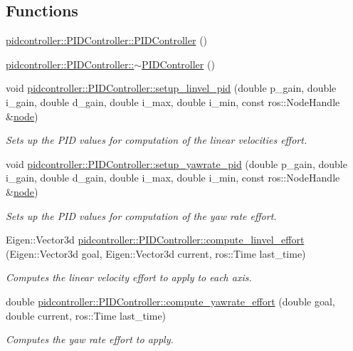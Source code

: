 \subsection*{Functions}
\begin{DoxyCompactItemize}
\item 
\mbox{\hyperlink{group__test__utils_ga67cc314aa5b3b4e9c47ac414b3a4c008}{pidcontroller\+::\+P\+I\+D\+Controller\+::\+P\+I\+D\+Controller}} ()
\item 
\mbox{\hyperlink{group__test__utils_ga4ae30cc03173417fa6edb5c055966a3f}{pidcontroller\+::\+P\+I\+D\+Controller\+::$\sim$\+P\+I\+D\+Controller}} ()
\item 
void \mbox{\hyperlink{group__test__utils_ga845b866b1ae4b73e39e4ca42395750b3}{pidcontroller\+::\+P\+I\+D\+Controller\+::setup\+\_\+linvel\+\_\+pid}} (double p\+\_\+gain, double i\+\_\+gain, double d\+\_\+gain, double i\+\_\+max, double i\+\_\+min, const ros\+::\+Node\+Handle \&\mbox{\hyperlink{structnode}{node}})
\begin{DoxyCompactList}\small\item\em Sets up the P\+ID values for computation of the linear velocities effort. \end{DoxyCompactList}\item 
void \mbox{\hyperlink{group__test__utils_ga5d8a387440921ea68907364c0e1d7b5b}{pidcontroller\+::\+P\+I\+D\+Controller\+::setup\+\_\+yawrate\+\_\+pid}} (double p\+\_\+gain, double i\+\_\+gain, double d\+\_\+gain, double i\+\_\+max, double i\+\_\+min, const ros\+::\+Node\+Handle \&\mbox{\hyperlink{structnode}{node}})
\begin{DoxyCompactList}\small\item\em Sets up the P\+ID values for computation of the yaw rate effort. \end{DoxyCompactList}\item 
Eigen\+::\+Vector3d \mbox{\hyperlink{group__test__utils_gac62955a265057681e6399488ced3471a}{pidcontroller\+::\+P\+I\+D\+Controller\+::compute\+\_\+linvel\+\_\+effort}} (Eigen\+::\+Vector3d goal, Eigen\+::\+Vector3d current, ros\+::\+Time last\+\_\+time)
\begin{DoxyCompactList}\small\item\em Computes the linear velocity effort to apply to each axis. \end{DoxyCompactList}\item 
double \mbox{\hyperlink{group__test__utils_gaee16eb0d9a067ac80a1d92e50991b60b}{pidcontroller\+::\+P\+I\+D\+Controller\+::compute\+\_\+yawrate\+\_\+effort}} (double goal, double current, ros\+::\+Time last\+\_\+time)
\begin{DoxyCompactList}\small\item\em Computes the yaw rate effort to apply. \end{DoxyCompactList}\end{DoxyCompactItemize}


